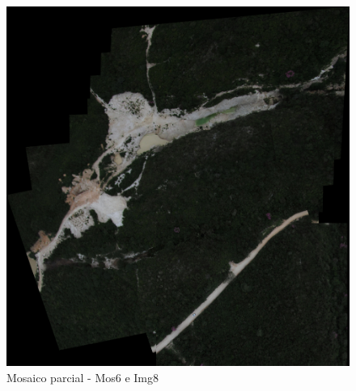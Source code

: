 \documentclass[9pt, a4paper, nofonttune, journal]{IEEEtran}
\begin{document}
\begin{figure}[!h]
\begin{center}
\includegraphics[scale=0.25]{figuras/Mosaic7}
\caption{Mosaico parcial - Mos6 e Img8}
\label{fig:mosaico}
\end{center}
\end{figure}
\end{document}

